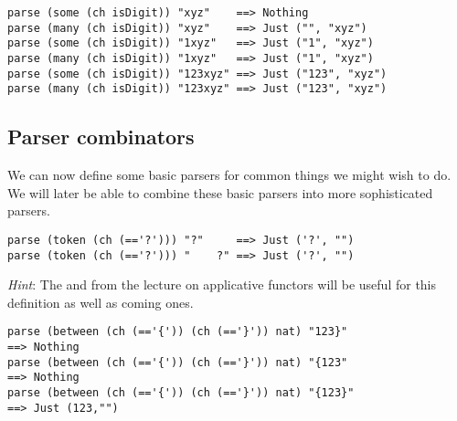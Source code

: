 \begin{verbatim}
parse (some (ch isDigit)) "xyz"    ==> Nothing
parse (many (ch isDigit)) "xyz"    ==> Just ("", "xyz")
parse (some (ch isDigit)) "1xyz"   ==> Just ("1", "xyz")
parse (many (ch isDigit)) "1xyz"   ==> Just ("1", "xyz")
parse (some (ch isDigit)) "123xyz" ==> Just ("123", "xyz")
parse (many (ch isDigit)) "123xyz" ==> Just ("123", "xyz")
\end{verbatim}

\taskLine

\subsection{Parser combinators}

We can now define some basic parsers for common things we might wish to do. We will later be able to combine these basic parsers into more sophisticated parsers. 

\taskLine 

\begin{verbatim}
parse (token (ch (=='?'))) "?"     ==> Just ('?', "")
parse (token (ch (=='?'))) "    ?" ==> Just ('?', "")
\end{verbatim}
\emph{Hint}: The \haskellIn{(*>)} and \haskellIn{(<*)} from the lecture on applicative functors will be useful for this definition as well as coming ones.

\begin{verbatim}
parse (between (ch (=='{')) (ch (=='}')) nat) "123}"  
==> Nothing
parse (between (ch (=='{')) (ch (=='}')) nat) "{123"  
==> Nothing
parse (between (ch (=='{')) (ch (=='}')) nat) "{123}" 
==> Just (123,"") 
\end{verbatim}

